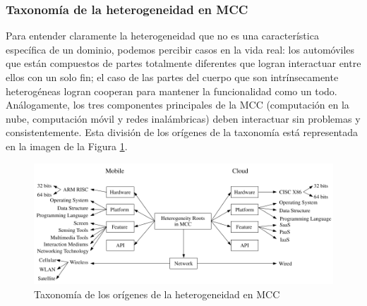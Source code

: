 \subsubsection{Taxonomía de la heterogeneidad en MCC}

Para entender claramente la heterogeneidad que no es una característica específica de un dominio, podemos percibir casos en la vida real:
los automóviles que están compuestos de partes totalmente diferentes que logran interactuar entre ellos con un solo fin; el caso de las
partes del cuerpo que
son intrínsecamente heterogéneas logran cooperan para mantener la funcionalidad como un todo. Análogamente, los tres componentes principales 
de la MCC (computación en la nube, computación móvil y redes inalámbricas) deben interactuar sin problemas y consistentemente. Esta división 
de los orígenes de la taxonomía está representada en la imagen de la Figura \ref{fig:heterogeinityRootsmcc}. 


\begin{figure}[h]
 \includegraphics[scale=0.45]{Figures/heterogeinityRootsmcc}
 \caption{Taxonomía de los orígenes de la heterogeneidad en MCC \cite{sanaei2014heterogeneity}}
 \label{fig:heterogeinityRootsmcc}
\end{figure}


